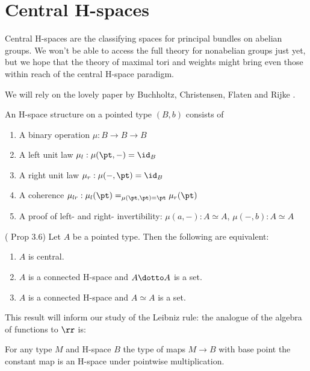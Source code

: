\section{Central H-spaces}\label{central-h-spaces}

Central H-spaces are the classifying spaces for principal bundles on
abelian groups. We won't be able to access the full theory for
nonabelian groups just yet, but we hope that the theory of maximal tori
and weights might bring even those within reach of the central H-space
paradigm.

We will rely on the lovely paper by Buchholtz, Christensen, Flaten and
Rijke \cite{buchholtz2023central}.

\begin{mydef}
An H-space structure on a pointed type \( (B,b) \) consists of
\begin{enumerate}
\item A binary operation \( \mu:B\to B\to B \)
\item A left unit law \( \mu_l:\mu(\pt,-)=\id_B \)
\item A right unit law \( \mu_r:\mu(-,\pt)=\id_B \)
\item A coherence \( \mu_{lr}:\mu_l(\pt)=_{\mu(\pt,\pt)=\pt}\mu_r(\pt) \)
\item A proof of left- and right- invertibility: \( \mu(a,-):A\simeq A \), \( \mu(-, b):A\simeq A \)
\end{enumerate}
\end{mydef}

\begin{myprop}
(\cite{buchholtz2023central} Prop 3.6) Let \( A \) be a pointed type. Then the following are equivalent:
\begin{enumerate}
\item \( A \) is central.
\item \( A \) is a connected H-space and \( A\dotto A \) is a set.
\item \( A \) is a connected H-space and \( A\simeq A \) is a set.
\end{enumerate}
\end{myprop}

This result will inform our study of the Leibniz rule: the analogue of
the algebra of functions to \(\rr\) is:

\begin{myprop}
For any type \( M \) and H-space \( B \) the type of maps \( M\to B \) with base point the constant map is an H-space under pointwise multiplication.
\end{myprop}

